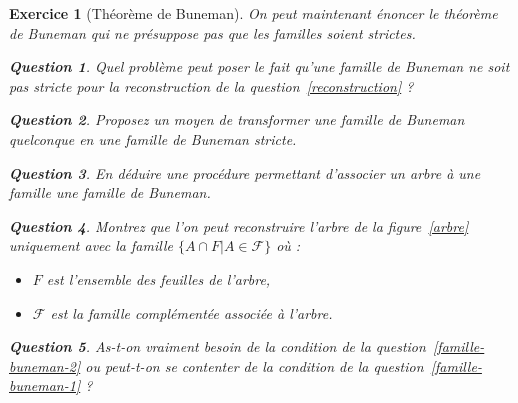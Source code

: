 \documentclass{article}
\theoremstyle{exostyle}
\newtheorem{exo}{Exercice}
\theoremstyle{partiestyle}
\theoremstyle{questionstyle}
\newtheorem{question}{Question}[exo]
\begin{document}
\begin{exo}[Théorème de Buneman]

	On peut maintenant énoncer le théorème de Buneman qui ne présuppose pas que les familles soient strictes.
	\begin{question}
		Quel problème peut poser le fait qu'une famille de Buneman ne soit pas stricte pour la reconstruction de la question~\ref{reconstruction}  ? 
	\end{question}
	\begin{question}
		Proposez un moyen de transformer une famille de Buneman quelconque en une famille de Buneman stricte.
	\end{question}
	\begin{question}
		En déduire une procédure permettant d'associer un arbre à une famille une famille de Buneman.
	\end{question}

	\begin{question}
		Montrez que l'on peut reconstruire l'arbre de la figure~\ref{arbre} uniquement avec la famille $\{ A \cap F \vert A \in \mathcal{F}\}$ où :

		\begin{itemize}
			\item $F$ est l'ensemble des feuilles de l'arbre,
			\item $\mathcal{F}$ est la famille complémentée associée à l'arbre.
		\end{itemize}
	\end{question}
	\begin{question}
		As-t-on vraiment besoin de la condition de la question~\ref{famille-buneman-2} ou peut-t-on se contenter de la condition de la question~\ref{famille-buneman-1} ?
	\end{question}

\end{exo}
\end{document}
